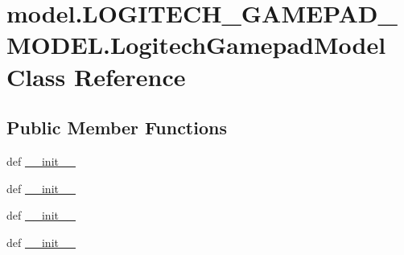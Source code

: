 \hypertarget{classmodel_1_1LOGITECH__GAMEPAD__MODEL_1_1LogitechGamepadModel}{}\section{model.\+L\+O\+G\+I\+T\+E\+C\+H\+\_\+\+G\+A\+M\+E\+P\+A\+D\+\_\+\+M\+O\+D\+E\+L.\+Logitech\+Gamepad\+Model Class Reference}
\label{classmodel_1_1LOGITECH__GAMEPAD__MODEL_1_1LogitechGamepadModel}
\subsection*{Public Member Functions}
\begin{DoxyCompactItemize}
\item 
def \hyperlink{classmodel_1_1LOGITECH__GAMEPAD__MODEL_1_1LogitechGamepadModel_a78c8eb4ec8b24bb9b7b3b5f8b89b1ae4}{\+\_\+\+\_\+init\+\_\+\+\_\+}
\item 
def \hyperlink{classmodel_1_1LOGITECH__GAMEPAD__MODEL_1_1LogitechGamepadModel_a78c8eb4ec8b24bb9b7b3b5f8b89b1ae4}{\+\_\+\+\_\+init\+\_\+\+\_\+}
\item 
def \hyperlink{classmodel_1_1LOGITECH__GAMEPAD__MODEL_1_1LogitechGamepadModel_a78c8eb4ec8b24bb9b7b3b5f8b89b1ae4}{\+\_\+\+\_\+init\+\_\+\+\_\+}
\item 
def \hyperlink{classmodel_1_1LOGITECH__GAMEPAD__MODEL_1_1LogitechGamepadModel_a78c8eb4ec8b24bb9b7b3b5f8b89b1ae4}{\+\_\+\+\_\+init\+\_\+\+\_\+}
\end{DoxyCompactItemize}
